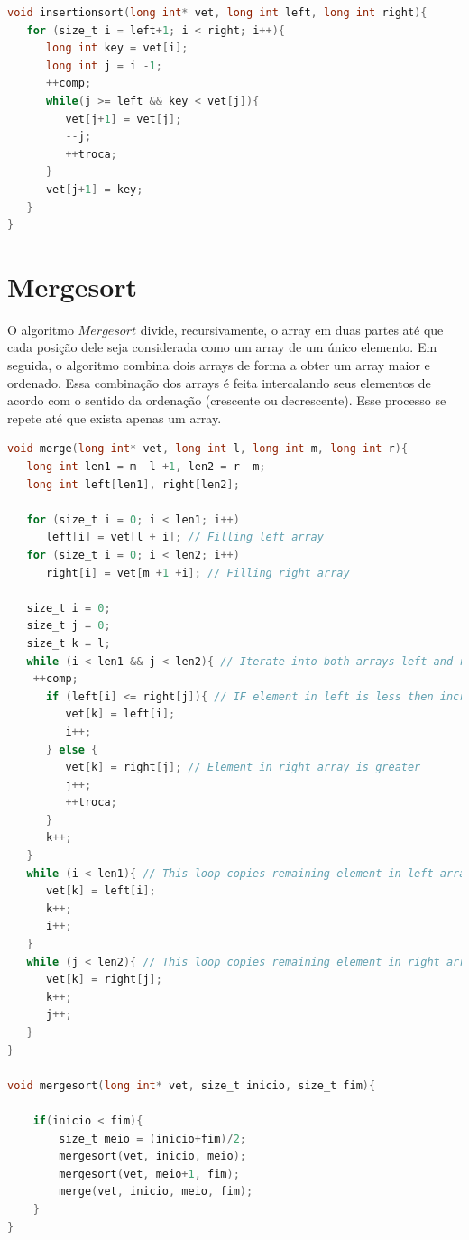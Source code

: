 \documentclass[report]{uftex}
\begin{document}
\begin{lstlisting}[language=C]
void insertionsort(long int* vet, long int left, long int right){
   for (size_t i = left+1; i < right; i++){
      long int key = vet[i];
      long int j = i -1;
      ++comp;
      while(j >= left && key < vet[j]){
         vet[j+1] = vet[j];
         --j;
         ++troca;
      }
      vet[j+1] = key;
   }
}
\end{lstlisting}


\section{Mergesort}
O algoritmo $Mergesort$ divide, recursivamente, o array em duas partes até que cada posição dele seja considerada como um array de um único elemento. Em seguida, o algoritmo combina dois arrays de forma a obter um array maior e ordenado. Essa combinação dos arrays é feita intercalando seus elementos de acordo com o sentido da ordenação (crescente ou decrescente). Esse processo se repete até que exista apenas um array.\\

\begin{lstlisting}[language=C]
void merge(long int* vet, long int l, long int m, long int r){
   long int len1 = m -l +1, len2 = r -m;
   long int left[len1], right[len2];

   for (size_t i = 0; i < len1; i++)
      left[i] = vet[l + i]; // Filling left array
   for (size_t i = 0; i < len2; i++)
      right[i] = vet[m +1 +i]; // Filling right array

   size_t i = 0;
   size_t j = 0;
   size_t k = l;
   while (i < len1 && j < len2){ // Iterate into both arrays left and right{
   	++comp;
      if (left[i] <= right[j]){ // IF element in left is less then increment i by pushing into larger array{
         vet[k] = left[i];
         i++;
      } else {
         vet[k] = right[j]; // Element in right array is greater
         j++;
         ++troca;
      }
      k++;
   }
   while (i < len1){ // This loop copies remaining element in left array{
      vet[k] = left[i];
      k++;
      i++;
   }
   while (j < len2){ // This loop copies remaining element in right array{
      vet[k] = right[j];
      k++;
      j++;
   }
}

void mergesort(long int* vet, size_t inicio, size_t fim){

	if(inicio < fim){
		size_t meio = (inicio+fim)/2;
		mergesort(vet, inicio, meio);
		mergesort(vet, meio+1, fim);
		merge(vet, inicio, meio, fim);
	}
}
\end{lstlisting}
\end{document}
